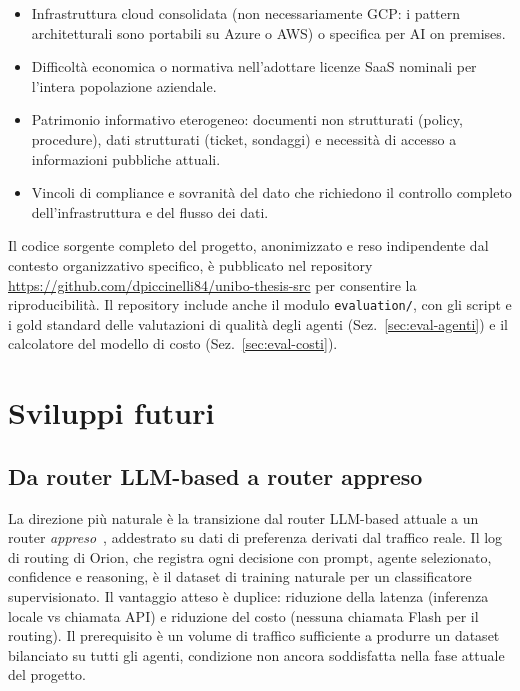 \begin{itemize}
  \item Infrastruttura cloud consolidata (non necessariamente GCP: i pattern architetturali sono portabili su Azure o AWS) o specifica per AI on premises.
  \item Difficoltà economica o normativa nell'adottare licenze SaaS nominali per l'intera popolazione aziendale.
  \item Patrimonio informativo eterogeneo: documenti non strutturati (policy, procedure), dati strutturati (ticket, sondaggi) e necessità di accesso a informazioni pubbliche attuali.
  \item Vincoli di compliance e sovranità del dato che richiedono il controllo completo dell'infrastruttura e del flusso dei dati.
\end{itemize}

Il codice sorgente completo del progetto, anonimizzato e reso indipendente dal contesto organizzativo specifico,
è pubblicato nel repository \url{https://github.com/dpiccinelli84/unibo-thesis-src} per consentire la riproducibilità. 
Il repository include anche il modulo \texttt{evaluation/}, con gli script e i gold standard delle valutazioni di qualità degli agenti (Sez.~\ref{sec:eval-agenti}) 
e il calcolatore del modello di costo (Sez.~\ref{sec:eval-costi}).

\section{Sviluppi futuri}
\label{sec:concl-futuri}

\subsection{Da router LLM-based a router appreso}
\label{subsec:concl-routellm}

La direzione più naturale è la transizione dal router LLM-based attuale a un router \emph{appreso}~\cite{ong2024routellm}, 
addestrato su dati di preferenza derivati dal traffico reale. 
Il log di routing di Orion, che registra ogni decisione con prompt, agente selezionato, confidence e reasoning, 
è il dataset di training naturale per un classificatore supervisionato. 
Il vantaggio atteso è duplice: riduzione della latenza (inferenza locale vs chiamata API) e riduzione del costo (nessuna chiamata Flash per il routing). 
Il prerequisito è un volume di traffico sufficiente a produrre un dataset bilanciato su tutti gli agenti, condizione non ancora soddisfatta nella fase attuale del progetto.

